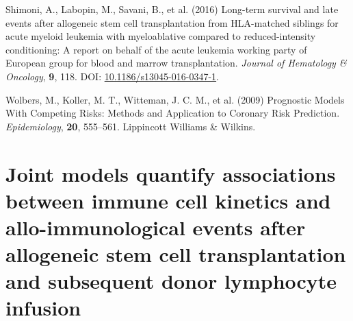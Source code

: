 \documentclass[
  letterpaper,
  DIV=11,
  numbers=noendperiod]{scrreprt}
\newlength{\cslhangindent}
\newlength{\cslentryspacingunit} %
\newenvironment{CSLReferences}[2] %
 {%
  \setlength{\parindent}{0pt}
  \ifodd #1
  \let\oldpar\par
  \def\par{\hangindent=\cslhangindent\oldpar}
  \fi
  \setlength{\parskip}{#2\cslentryspacingunit}
 }%
 {}
\begin{document}
\begin{CSLReferences}{1}{0}
\leavevmode{}%
Shimoni, A., Labopin, M., Savani, B., et al. (2016) Long-term survival
and late events after allogeneic stem cell transplantation from
{HLA-matched} siblings for acute myeloid leukemia with myeloablative
compared to reduced-intensity conditioning: A report on behalf of the
acute leukemia working party of {European} group for blood and marrow
transplantation. \emph{Journal of Hematology \& Oncology}, \textbf{9},
118. DOI:
\href{https://doi.org/10.1186/s13045-016-0347-1}{10.1186/s13045-016-0347-1}.

\leavevmode{}%
Wolbers, M., Koller, M. T., Witteman, J. C. M., et al. (2009) Prognostic
{Models With Competing Risks}: {Methods} and {Application} to {Coronary
Risk Prediction}. \emph{Epidemiology}, \textbf{20}, 555--561. Lippincott
Williams \& Wilkins.

\end{CSLReferences}


\hypertarget{joint-models-quantify-associations-between-immune-cell-kinetics-and-allo-immunological-events-after-allogeneic-stem-cell-transplantation-and-subsequent-donor-lymphocyte-infusion}{%
\chapter{Joint models quantify associations between immune cell kinetics
and allo-immunological events after allogeneic stem cell transplantation
and subsequent donor lymphocyte
infusion}\label{joint-models-quantify-associations-between-immune-cell-kinetics-and-allo-immunological-events-after-allogeneic-stem-cell-transplantation-and-subsequent-donor-lymphocyte-infusion}}
\end{document}
